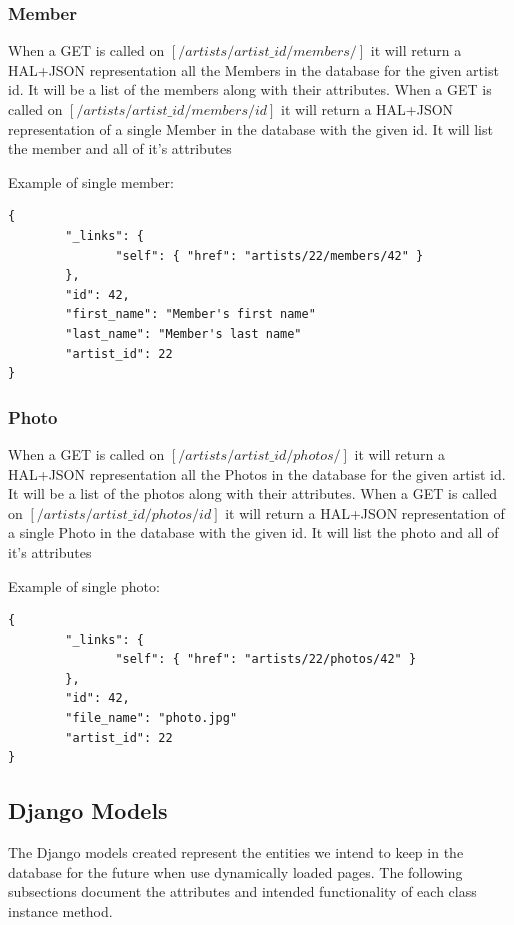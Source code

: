 \documentclass[12pt,english]{scrartcl}
\begin{document}
\subsubsection{Member}
When a GET is called on $[/artists/{artist\_id}/members/]$ it will return a HAL+JSON representation all the Members in the database for the given artist id.  It will be a list of the members along with their attributes.
When a GET is called on $[/artists/{artist\_id}/members/{id}]$ it will return a HAL+JSON representation of a single Member in the database with the given id.  It will list the member and all of it's attributes

Example of single member:
\begin{verbatim}
{
        "_links": {
               "self": { "href": "artists/22/members/42" }
        },
        "id": 42,
        "first_name": "Member's first name"
        "last_name": "Member's last name"
        "artist_id": 22
}
\end{verbatim}
\subsubsection{Photo}
When a GET is called on $[/artists/{artist\_id}/photos/]$ it will return a HAL+JSON representation all the Photos in the database for the given artist id.  It will be a list of the photos along with their attributes.
When a GET is called on $[/artists/{artist\_id}/photos/{id}]$ it will return a HAL+JSON representation of a single Photo in the database with the given id.  It will list the photo and all of it's attributes

Example of single photo:
\begin{verbatim}
{
        "_links": {
               "self": { "href": "artists/22/photos/42" }
        },
        "id": 42,
        "file_name": "photo.jpg"
        "artist_id": 22
}
\end{verbatim}

\subsection{Django Models}
The Django models created represent the entities we intend to keep in the database for the future when use dynamically loaded pages.
The following subsections document the attributes and intended functionality of each class instance method.
\end{document}
